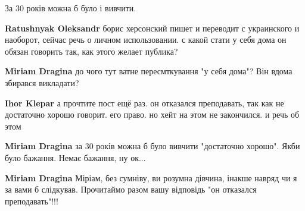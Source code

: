 \begin{itemize}
За 30 років можна б було і вивчити.

\begin{itemize}
 
\textbf{Ratushnyak Oleksandr} борис херсонский пишет и переводит с украинского и наоборот, сейчас речь о личном использовании. с какой стати у себя дома он обязан говорить так, как этого желает публика?

 
\textbf{Miriam Dragina} до чого тут ватне пересмткування "у себя дома"? Він вдома збирався викладати?

 
\textbf{Ihor Klepar} а прочтите пост ещё раз. он отказался преподавать, так как не достаточно хорошо говорит. его право. но хейт на этом не закончился. и речь об этом

 
\textbf{Miriam Dragina} за 30 років можна б було вивчити "достаточно хорошо". Якби було бажання. Немає бажання, ну ок...

 
\textbf{Miriam Dragina} Міріам, без сумніву, ви розумна дівчина, інакше навряд чи я за вами б слідкував. Прочитаймо разом вашу відповідь "он отказался преподавать"!!!

 

\end{itemize}
\end{itemize}
